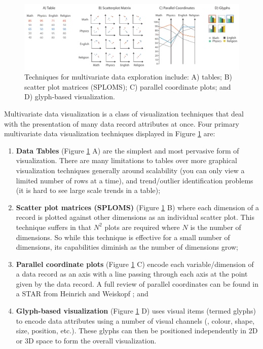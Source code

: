 \begin{figure}[t!]
\includegraphics[width=\textwidth]{images/introduction/multivariate_vis}
\caption{Techniques for multivariate data exploration include: A) tables; B) scatter plot matrices (SPLOMS); C) parallel coordinate plots; and D) glyph-based visualization.}
\label{fig:multivariate_vis}
\end{figure}

Multivariate data visualization is a class of visualization techniques that deal with the presentation of many data record attributes at once.
Four primary multivariate data visualization techniques displayed in Figure \ref{fig:multivariate_vis} are:

\begin{enumerate}
\item \textbf{Data Tables} (Figure \ref{fig:multivariate_vis} A) are the simplest and most pervasive form of visualization.
There are many limitations to tables over more graphical visualization techniques generally around scalability (you can only view a limited number of rows at a time), and trend/outlier identification problems (it is hard to see large scale trends in a table);

\item \textbf{Scatter plot matrices (SPLOMS)} (Figure \ref{fig:multivariate_vis} B) where each dimension of a record is plotted against other dimensions \cite{Elmqvist2008Scatter} as an individual scatter plot.
This technique suffers in that $N^2$ plots are required where $N$ is the number of dimensions.
So while this technique is effective for a small number of dimensions, its capabilities diminish as the number of dimensions grow; 

\item \textbf{Parallel coordinate plots} (Figure \ref{fig:multivariate_vis} C) encode each variable/dimension of a data record as an axis with a line passing through each axis at the point given by the data record.
A full review of parallel coordinates can be found in a STAR from Heinrich and Weiskopf \cite{heinrich2012state}; and

\item \textbf{Glyph-based visualization} (Figure \ref{fig:multivariate_vis} D) uses visual items (termed glyphs) to encode data attributes using a number of visual channels (\eg, colour, shape, size, position, etc.).
These glyphs can then be positioned independently in 2D or 3D space to form the overall visualization.
\end{enumerate}


